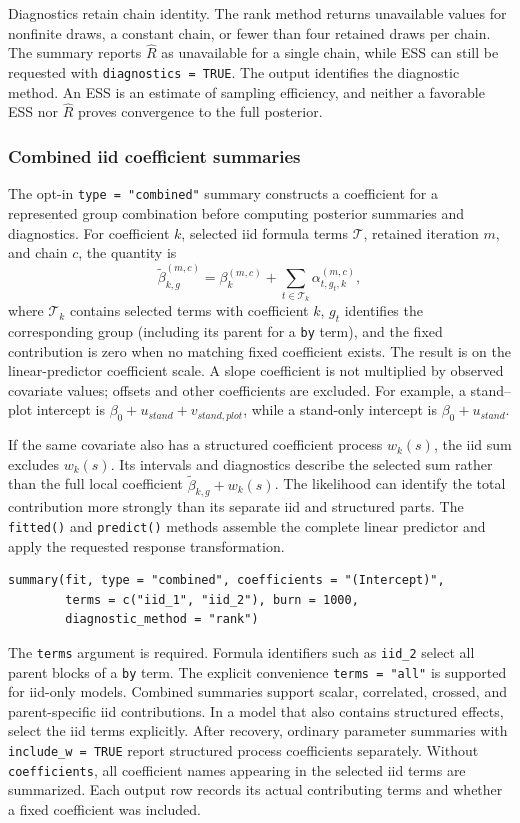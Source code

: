 \documentclass[11pt]{article}
\begin{document}
Diagnostics retain chain identity. The rank method returns unavailable values for nonfinite draws, a constant chain, or fewer than four retained draws per chain. The summary reports $\hat R$ as unavailable for a single chain, while ESS can still be requested with \texttt{diagnostics = TRUE}. The output identifies the diagnostic method. An ESS is an estimate of sampling efficiency, and neither a favorable ESS nor $\hat R$ proves convergence to the full posterior.

\subsubsection{Combined iid coefficient summaries}
The opt-in \texttt{type = "combined"} summary constructs a coefficient for a represented group combination before computing posterior summaries and diagnostics. For coefficient $k$, selected iid formula terms $\mathcal T$, retained iteration $m$, and chain $c$, the quantity is
\[
\widetilde\beta^{(m,c)}_{k,g}
 = \beta^{(m,c)}_k + \sum_{t\in\mathcal T_k}
       \alpha^{(m,c)}_{t,g_t,k},
\]
where $\mathcal T_k$ contains selected terms with coefficient $k$, $g_t$ identifies the corresponding group (including its parent for a \texttt{by} term), and the fixed contribution is zero when no matching fixed coefficient exists. The result is on the linear-predictor coefficient scale. A slope coefficient is not multiplied by observed covariate values; offsets and other coefficients are excluded. For example, a stand--plot intercept is $\beta_0+u_{stand}+v_{stand,plot}$, while a stand-only intercept is $\beta_0+u_{stand}$.

If the same covariate also has a structured coefficient process $w_k(s)$, the iid sum excludes $w_k(s)$. Its intervals and diagnostics describe the selected sum rather than the full local coefficient $\widetilde\beta_{k,g}+w_k(s)$. The likelihood can identify the total contribution more strongly than its separate iid and structured parts. The \texttt{fitted()} and \texttt{predict()} methods assemble the complete linear predictor and apply the requested response transformation.

\begin{verbatim}
summary(fit, type = "combined", coefficients = "(Intercept)",
        terms = c("iid_1", "iid_2"), burn = 1000,
        diagnostic_method = "rank")
\end{verbatim}

The \texttt{terms} argument is required. Formula identifiers such as \texttt{iid\_2} select all parent blocks of a \texttt{by} term. The explicit convenience \texttt{terms = "all"} is supported for iid-only models. Combined summaries support scalar, correlated, crossed, and parent-specific iid contributions. In a model that also contains structured effects, select the iid terms explicitly. After recovery, ordinary parameter summaries with \texttt{include\_w = TRUE} report structured process coefficients separately. Without \texttt{coefficients}, all coefficient names appearing in the selected iid terms are summarized. Each output row records its actual contributing terms and whether a fixed coefficient was included.
\end{document}
